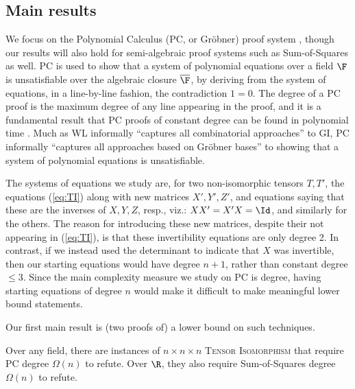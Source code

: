 \subsection{Main results}

We focus on the Polynomial Calculus (PC, or Gr\"{o}bner) proof system \cite{CEI}, though our results will also hold for semi-algebraic proof systems such as Sum-of-Squares \cite{lasserre} as well. PC is used to show that a system of polynomial equations over a field $\F$ is unsatisfiable over the algebraic closure $\overline{\F}$, by deriving from the system of equations, in a line-by-line fashion, the contradiction $1=0$. The degree of a PC proof is the maximum degree of any line appearing in the proof, and it is a fundamental result that PC proofs of constant degree can be found in polynomial time \cite{CEI}. Much as WL informally ``captures all combinatorial approaches'' to \textsc{GI}, PC informally ``captures all approaches based on Gr\"{o}bner bases'' to showing that a system of polynomial equations is unsatisfiable. 

The systems of equations we study are, for two non-isomorphic tensors $T,T'$, the equations (\ref{eq:TI}) along with new matrices $X',Y',Z'$, and equations saying that these are the inverses of $X,Y,Z$, resp., viz.: $XX'=X'X = \Id$, and similarly for the others. The reason for introducing these new matrices, despite their not appearing in (\ref{eq:TI}), is that these invertibility equations are only degree 2. In contrast, if we instead used the determinant to indicate that $X$ was invertible, then our starting equations would have degree $n+1$, rather than constant degree $\leq 3$. Since the main complexity measure we study on PC is degree, having starting equations of degree $n$ would make it difficult to make meaningful lower bound statements.

Our first main result is (two proofs of) a lower bound on such techniques.

\begin{theorem} \label{thm:lowerMain}
Over any field, there are instances of $n \times n \times n$ \textsc{Tensor Isomorphism} that require PC degree $\Omega(n)$ to refute. Over $\R$, they also require Sum-of-Squares degree $\Omega(n)$ to refute.
\end{theorem}

